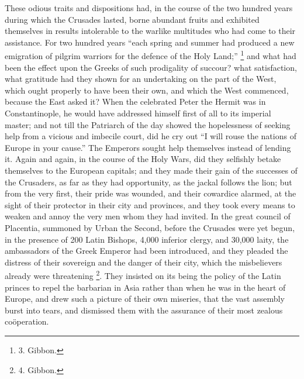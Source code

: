 These odious traits and
dispositions had, in the course of the two hundred years during which
the Crusades lasted, borne abundant fruits and exhibited themselves in
results intolerable to the warlike multitudes who had come to their
assistance. For two hundred years ``each spring and summer had produced
a new emigration of pilgrim warriors for the defence of the Holy Land;''
\footnote{3.
Gibbon.} and what had been the
effect upon the Greeks of such prodigality of succour? what
satisfaction, what gratitude had they shown for an undertaking on the
part of the West, which ought properly to have been their own, and
which the West commenced, because the East asked it? When the
celebrated Peter the Hermit was in Constantinople, he would have
addressed himself first of all to its imperial master; and not till
the Patriarch of the day showed the hopelessness of seeking help from
a vicious and imbecile court, did he cry out ``I will rouse the nations
of Europe in your cause.'' The Emperors sought help themselves instead
of lending it. Again and again, in the course of the Holy Wars, did
they selfishly betake themselves to the European capitals; and they
made their gain of the successes of the Crusaders, as far as
they had opportunity, as the jackal follows the lion; but from the
very first, their pride was wounded, and their cowardice alarmed, at
the sight of their protector in their city and provinces, and they
took every means to weaken and annoy the very men whom they had
invited. In the great council of Placentia, summoned by Urban the
Second, before the Crusades were yet begun, in the presence of 200
Latin Bishops, 4,000 inferior clergy, and 30,000 laity, the
ambassadors of the Greek Emperor had been introduced, and they pleaded
the distress of their sovereign and the danger of their city, which
the misbelievers already were threatening \footnote{4.
Gibbon.}. They insisted on its being the policy of the Latin princes to
repel the barbarian in Asia rather than when he was in the heart of
Europe, and drew such a picture of their own miseries, that the vast
assembly burst into tears, and dismissed them with the assurance of
their most zealous coöperation.


